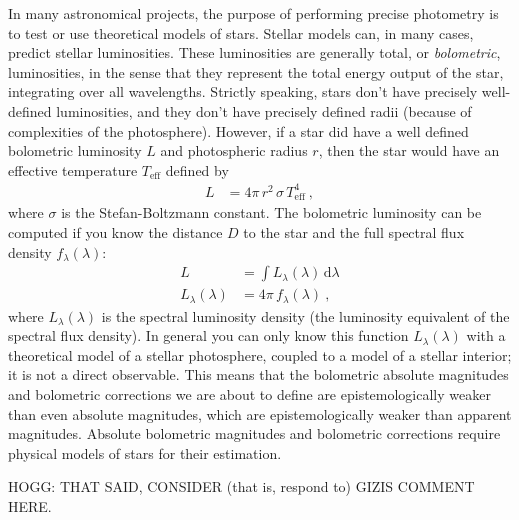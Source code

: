 \documentclass[10pt]{article}
\newcommand{\dd}{\mathrm{d}}
\newcommand{\eff}{\text{eff}}
\begin{document}
In many astronomical projects, the purpose of performing precise photometry is to test or use theoretical models of stars.
Stellar models can, in many cases, predict stellar luminosities.
These luminosities are generally total, or \emph{bolometric}, luminosities, in the sense that they represent the total energy output of the star, integrating over all wavelengths.
Strictly speaking, stars don't have precisely well-defined luminosities, and they don't have precisely defined radii (because of complexities of the photosphere).
However, if a star did have a well defined bolometric luminosity $L$ and photospheric radius $r$, then the star would have an effective temperature $T_\eff$ defined by
\begin{align}
    L &= 4\pi\,r^2\,\sigma\,T_\eff^4 ~,
\end{align}
where $\sigma$ is the Stefan-Boltzmann constant.
The bolometric luminosity can be computed if you know the distance $D$ to the star and the full spectral flux density $f_\lambda(\lambda)$:
\begin{align}
    L &= \int L_\lambda(\lambda)\,\dd\lambda\label{eq:L}\\
    L_\lambda(\lambda) &= 4\pi\,f_\lambda(\lambda)\label{eq:L_lambda}~,
\end{align}
where $L_\lambda(\lambda)$ is the spectral luminosity density (the luminosity equivalent of the spectral flux density).
In general you can only know this function $L_\lambda(\lambda)$ with a theoretical model of a stellar photosphere, coupled to a model of a stellar interior; it is not a direct observable.
This means that the bolometric absolute magnitudes and bolometric corrections we are about to define are epistemologically weaker than even absolute magnitudes, which are epistemologically weaker than apparent magnitudes.
Absolute bolometric magnitudes and bolometric corrections require physical models of stars for their estimation.

HOGG: THAT SAID, CONSIDER (that is, respond to) GIZIS COMMENT HERE.
\end{document}
